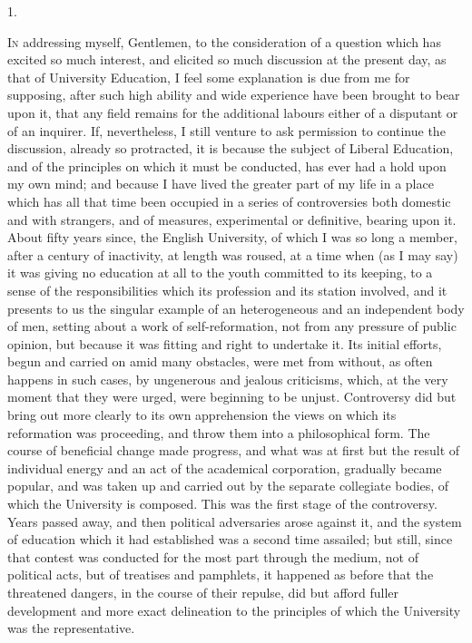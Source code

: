 1.

I\textsc{n} addressing myself, Gentlemen, to the consideration of a
question which has excited so much interest, and elicited so much
discussion at the present day, as that of University Education, I feel
some explanation is due from me for supposing, after such high ability
and wide experience have been brought to bear upon it, that any field
remains for the additional labours either of a disputant or of an
inquirer. If, nevertheless, I still venture to ask permission to
continue the discussion, already so protracted, it is because the
subject of Liberal Education, and of the principles on which it must
be conducted, has ever had a hold upon my own mind; and because I have
lived the greater part of my life in a place which has all that time
been occupied in a series of controversies both domestic and with
strangers, and of measures, experimental or definitive, bearing upon
it. About fifty years since, the English University, of which I was so
long a member, after a century of inactivity, at length was roused, at
a time when (as I may say) it was giving no education at all to the
youth committed to its keeping, to a sense of the responsibilities
which its profession and its station involved, and it presents to us
the singular example of an heterogeneous and an independent body
of men, setting about a work of self-reformation, not from any
pressure of public opinion, but because it was fitting and right to
undertake it. Its initial efforts, begun and carried on amid many
obstacles, were met from without, as often happens in such cases, by
ungenerous and jealous criticisms, which, at the very moment that they
were urged, were beginning to be unjust. Controversy did but bring out
more clearly to its own apprehension the views on which its
reformation was proceeding, and throw them into a philosophical form.
The course of beneficial change made progress, and what was at first
but the result of individual energy and an act of the academical
corporation, gradually became popular, and was taken up and carried
out by the separate collegiate bodies, of which the University is
composed. This was the first stage of the controversy. Years passed
away, and then political adversaries arose against it, and the system
of education which it had established was a second time assailed; but
still, since that contest was conducted for the most part through the
medium, not of political acts, but of treatises and pamphlets, it
happened as before that the threatened dangers, in the course of their
repulse, did but afford fuller development and more exact delineation
to the principles of which the University was the representative.


